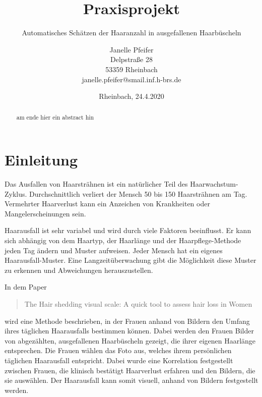 \documentclass[german,a4paper, 12pt]{llncs}
\title{Praxisprojekt}
\subtitle{Automatisches Schätzen der Haaranzahl in ausgefallenen Haarbüscheln}
\author{\parbox{.9\textwidth}{\centering 
		\large Janelle Pfeifer \\
		\small Delpstraße 28\\
		53359 Rheinbach \\
		janelle.pfeifer@smail.inf.h-brs.de}}
\institute{\parbox{.9\textwidth}{\centering 
		\large Hochschule Bonn-Rhein-Sieg \\
		\normalsize Institute of Visual Computing \\ 
		\small Fachbereich Informatik \\
		Studiengang: Informatik (B.SC.)\\
		\normalsize Rheinbach, 24.4.2020}}
\date{Rheinbach, 24.4.2020}
\begin{document}
	\maketitle
	\newpage
	\tableofcontents
	\newpage

\begin{abstract}
	am ende hier ein abstract hin
\end{abstract}

\section{Einleitung}

Das Ausfallen von Haarsträhnen ist ein natürlicher Teil des Haarwachstum-Zyklus. Durchschnittlich verliert der Mensch 50 bis 150 Haarsträhnen am Tag. Vermehrter Haarverlust kann ein Anzeichen von Krankheiten oder Mangelerscheinungen sein.\cite{averageHairshedding}

Haarausfall ist sehr variabel und wird durch viele Faktoren beeinflusst. Er kann sich abhängig von dem Haartyp, der Haarlänge und der Haarpflege-Methode jeden Tag ändern und Muster aufweisen. Jeder Mensch hat ein eigenes Haarausfall-Muster. Eine Langzeitüberwachung gibt die Möglichkeit diese Muster zu erkennen und Abweichungen herauszustellen. \cite{chemicalAlopecia,ironDeficiency,seasoalShedding}

In dem Paper \blockquote{The Hair shedding visual scale: A quick tool to assess hair loss in Women} wird eine Methode beschrieben, in der Frauen anhand von Bildern den Umfang ihres täglichen Haarausfalls bestimmen können. Dabei werden den Frauen Bilder von abgezählten, ausgefallenen Haarbüscheln gezeigt, die ihrer eigenen Haarlänge entsprechen. Die Frauen wählen das Foto aus, welches ihrem persönlichen täglichen Haarausfall entspricht. Dabei wurde eine Korrelation festgestellt zwischen Frauen, die klinisch bestätigt Haarverlust erfahren und den Bildern, die sie auswählen.
Der Haarausfall kann somit visuell, anhand von Bildern festgestellt werden.\cite{visualScale}
\end{document}
